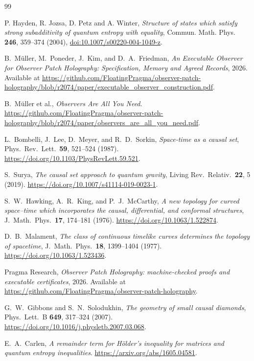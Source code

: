 \documentclass[11pt]{article}
\begin{document}
\begin{thebibliography}{99}

P. Hayden, R. Jozsa, D. Petz and A. Winter,
\emph{Structure of states which satisfy strong subadditivity of quantum entropy with equality},
Commun. Math. Phys. \textbf{246}, 359--374 (2004),
\href{https://doi.org/10.1007/s00220-004-1049-z}{doi:10.1007/s00220-004-1049-z}.


B.~M\"uller, M.~Poneder, J.~Kim, and D.~A.~Friedman,
\emph{An Executable Observer for Observer Patch Holography: Specification, Memory and Agreed Records},
2026.
Available at \url{https://github.com/FloatingPragma/observer-patch-holography/blob/r2074/paper/executable_observer_construction.pdf}.

B.~M\"uller et al., \emph{Observers Are All You Need}.
\url{https://github.com/FloatingPragma/observer-patch-holography/blob/r2074/paper/observers_are_all_you_need.pdf}.

L.~Bombelli, J.~Lee, D.~Meyer, and R.~D.~Sorkin,
\emph{Space-time as a causal set},
Phys.\ Rev.\ Lett.\ \textbf{59}, 521--524 (1987).
\url{https://doi.org/10.1103/PhysRevLett.59.521}.

S.~Surya,
\emph{The causal set approach to quantum gravity},
Living Rev.\ Relativ.\ \textbf{22}, 5 (2019).
\url{https://doi.org/10.1007/s41114-019-0023-1}.

S.~W.~Hawking, A.~R.~King, and P.~J.~McCarthy,
\emph{A new topology for curved space--time which incorporates the causal,
differential, and conformal structures},
J.\ Math.\ Phys.\ \textbf{17}, 174--181 (1976).
\url{https://doi.org/10.1063/1.522874}.

D.~B.~Malament,
\emph{The class of continuous timelike curves determines the topology of spacetime},
J.\ Math.\ Phys.\ \textbf{18}, 1399--1404 (1977).
\url{https://doi.org/10.1063/1.523436}.

Pragma Research,
\emph{Observer Patch Holography: machine-checked proofs and executable certificates},
2026.
Available at \url{https://github.com/FloatingPragma/observer-patch-holography}.

G.~W.~Gibbons and S.~N.~Solodukhin,
\emph{The geometry of small causal diamonds},
Phys.\ Lett.\ B \textbf{649}, 317--324 (2007).
\url{https://doi.org/10.1016/j.physletb.2007.03.068}.

E.~A.~Carlen,
\emph{A remainder term for H\"older's inequality for matrices and quantum entropy inequalities}.
\url{https://arxiv.org/abs/1605.04581}.


\end{thebibliography}
\end{document}
